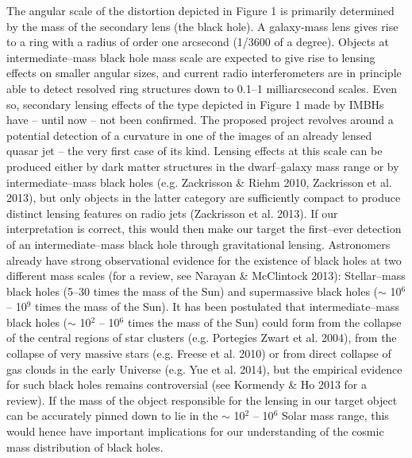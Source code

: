 \documentclass[a4paper, 11pt]{article}
\begin{document}
The angular scale of the distortion depicted in Figure 1 is primarily determined by the mass of the secondary lens (the black hole). A galaxy-mass lens gives rise to a ring with a radius of order one arcsecond (1/3600 of a degree). Objects at intermediate--mass black hole mass scale are expected to give rise to lensing effects on smaller angular sizes, and current radio interferometers are in principle able to detect resolved ring structures down to 0.1--1 milliarcsecond scales. Even so, secondary lensing effects of the type depicted in Figure 1 made by IMBHs have – until now – not been confirmed. The proposed project revolves around a potential detection of a curvature in one of the images of an already lensed quasar jet -- the very first case of its kind. Lensing effects at this scale can be produced either by dark matter structures in the dwarf--galaxy mass range or by intermediate--mass black holes (e.g. Zackrisson \& Riehm 2010, Zackrisson et al. 2013), but only objects in the latter category are sufficiently compact to produce distinct lensing features on radio jets (Zackrisson et al. 2013). If our interpretation is correct, this would then make our target the first--ever detection of an intermediate--mass black hole through gravitational lensing. Astronomers already have strong observational evidence for the existence of black holes at two different mass scales (for a review, see Narayan \& McClintock 2013): Stellar--mass black holes (5--30 times the mass of the Sun) and supermassive black holes ($\sim$ 10$^6$ -- 10$^9$ times the mass of the Sun). It has been postulated that intermediate--mass black holes ($\sim$ 10$^2$ -- 10$^6$ times the mass of the Sun) could form from the collapse of the central regions of star clusters (e.g. Portegies Zwart et al. 2004), from the collapse of very massive stars (e.g. Freese et al. 2010) or from direct collapse of gas clouds in the early Universe (e.g. Yue et al. 2014), but the empirical evidence for such black holes remains controversial (see Kormendy \& Ho 2013 for a review). If the mass of the object responsible for the lensing in our target object can be accurately pinned down to lie in the $\sim$ 10$^2$ -- 10$^6$ Solar mass range, this would hence have important implications for our understanding of the cosmic mass distribution of black holes.
\end{document}

